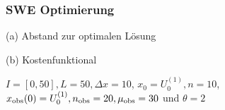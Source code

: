 \begin{frame}[<+->]
\frametitle{SWE Optimierung}
\centering
\begin{minipage}[b]{0.49\linewidth}
 \centering

(a) Abstand zur optimalen Lösung
\end{minipage}
\begin{minipage}[b]{0.49\linewidth}
 \centering

(b) Kostenfunktional
\end{minipage}
$I=[0,50],L=50,\Delta x=10$, $x_0=U_0^{(1)},n=10$, $x_\text{obs}(0) = U_0^{(1)}, n_{\text{obs}}=20,\mu_{\text{obs}}=30$ und $\theta=2$

\end{frame}
